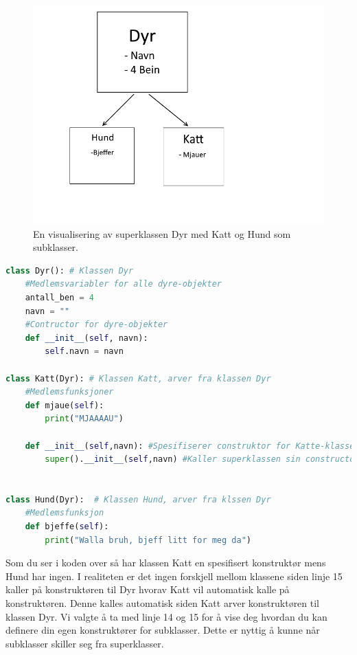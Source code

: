 \begin{figure}[H]
    \centering
    \includegraphics[scale=0.5]{Figures/Klasser_Dyr.png}
    \caption{En visualisering av superklassen Dyr med Katt og Hund som subklasser.}
    \label{fig:uperklasse}
\end{figure}
\clearpage
\begin{lstlisting}[language=python]
class Dyr(): # Klassen Dyr
    #Medlemsvariabler for alle dyre-objekter
    antall_ben = 4
    navn = ""
    #Contructor for dyre-objekter
    def __init__(self, navn):
        self.navn = navn

class Katt(Dyr): # Klassen Katt, arver fra klassen Dyr
    #Medlemsfunksjoner
    def mjaue(self):
        print("MJAAAAU")
        
    def __init__(self,navn): #Spesifiserer construktor for Katte-klassen
        super().__init__(self,navn) #Kaller superklassen sin constructor


class Hund(Dyr):  # Klassen Hund, arver fra klssen Dyr
    #Medlemsfunksjon
    def bjeffe(self):
        print("Walla bruh, bjeff litt for meg da")
\end{lstlisting}

Som du ser i koden over så har klassen Katt en spesifisert konstruktør mens Hund har ingen. I realiteten er det ingen forskjell mellom klassene siden linje 15 kaller på konstruktøren til Dyr hvorav Katt vil automatisk kalle på konstruktøren. Denne kalles automatisk siden Katt arver konstruktøren til klassen Dyr. Vi valgte å ta med linje 14 og 15 for å vise deg hvordan du kan definere din egen konstruktører for subklasser. Dette er nyttig å kunne når subklasser skiller seg fra superklasser.

